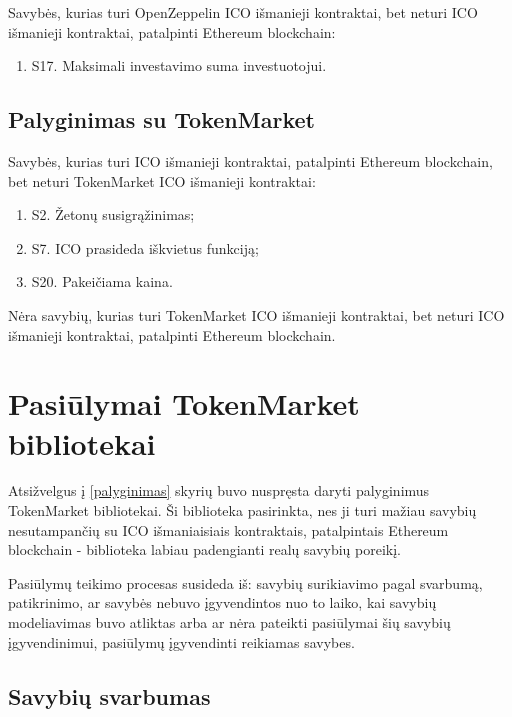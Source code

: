 \documentclass{VUMIFPSbakalaurinis}
\begin{document}
Savybės, kurias turi OpenZeppelin ICO išmanieji kontraktai, bet neturi ICO išmanieji kontraktai, patalpinti Ethereum blockchain:
\begin{enumerate}[topsep=0pt,itemsep=-1ex,partopsep=1ex,parsep=1ex]
\item S17. Maksimali investavimo suma investuotojui.
\end{enumerate}


\subsection{Palyginimas su TokenMarket} \label{tm:palyginimas}

Savybės, kurias turi ICO išmanieji kontraktai, patalpinti Ethereum blockchain, bet neturi TokenMarket ICO išmanieji kontraktai:
\begin{enumerate}[topsep=0pt,itemsep=-1ex,partopsep=1ex,parsep=1ex]
\item S2. Žetonų susigrąžinimas;
\item S7. ICO prasideda iškvietus funkciją;
\item S20. Pakeičiama kaina.
\end{enumerate}

                                                                                                                                                                                                                                Nėra savybių, kurias turi TokenMarket ICO išmanieji kontraktai, bet neturi ICO išmanieji kontraktai, patalpinti Ethereum blockchain.

\section{Pasiūlymai TokenMarket bibliotekai}


Atsižvelgus į \ref{palyginimas} skyrių buvo nuspręsta daryti palyginimus TokenMarket bibliotekai. Ši biblioteka pasirinkta, nes ji turi mažiau savybių nesutampančių su ICO išmaniaisiais kontraktais, patalpintais Ethereum blockchain - biblioteka labiau padengianti realų savybių poreikį.

Pasiūlymų teikimo procesas susideda iš: savybių surikiavimo pagal svarbumą, patikrinimo, ar savybės nebuvo įgyvendintos nuo to laiko, kai savybių modeliavimas buvo atliktas arba ar nėra pateikti pasiūlymai šių savybių įgyvendinimui, pasiūlymų įgyvendinti reikiamas savybes.


\subsection{Savybių svarbumas}
\end{document}
